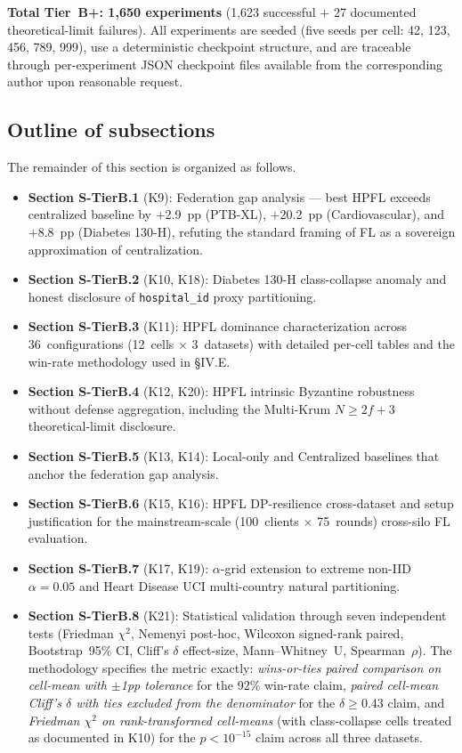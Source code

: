 \documentclass[conference]{IEEEtran}
\begin{document}
\noindent \textbf{Total Tier~B+: 1{,}650 experiments} (1{,}623 successful $+$ 27 documented theoretical-limit failures). All experiments are seeded (five seeds per cell: 42, 123, 456, 789, 999), use a deterministic checkpoint structure, and are traceable through per-experiment JSON checkpoint files available from the corresponding author upon reasonable request.

\subsection*{Outline of subsections}
\label{sec:tier_b_outline}

The remainder of this section is organized as follows.

\begin{itemize}
\item \textbf{Section S-TierB.1} (K9): Federation gap analysis --- best HPFL exceeds centralized baseline by $+$2.9~pp (PTB-XL), $+$20.2~pp (Cardiovascular), and $+$8.8~pp (Diabetes 130-H), refuting the standard framing of FL as a sovereign approximation of centralization.
\item \textbf{Section S-TierB.2} (K10, K18): Diabetes 130-H class-collapse anomaly and honest disclosure of \texttt{hospital\_id} proxy partitioning.
\item \textbf{Section S-TierB.3} (K11): HPFL dominance characterization across 36~configurations (12~cells $\times$ 3~datasets) with detailed per-cell tables and the win-rate methodology used in §IV.E.
\item \textbf{Section S-TierB.4} (K12, K20): HPFL intrinsic Byzantine robustness without defense aggregation, including the Multi-Krum $N{\geq}2f{+}3$ theoretical-limit disclosure.
\item \textbf{Section S-TierB.5} (K13, K14): Local-only and Centralized baselines that anchor the federation gap analysis.
\item \textbf{Section S-TierB.6} (K15, K16): HPFL DP-resilience cross-dataset and setup justification for the mainstream-scale (100~clients $\times$ 75~rounds) cross-silo FL evaluation.
\item \textbf{Section S-TierB.7} (K17, K19): $\alpha$-grid extension to extreme non-IID $\alpha{=}0.05$ and Heart Disease UCI multi-country natural partitioning.
\item \textbf{Section S-TierB.8} (K21): Statistical validation through seven independent tests (Friedman $\chi^2$, Nemenyi post-hoc, Wilcoxon signed-rank paired, Bootstrap~95\% CI, Cliff's $\delta$ effect-size, Mann--Whitney~U, Spearman~$\rho$). The methodology specifies the metric exactly: \emph{wins-or-ties paired comparison on cell-mean with $\pm$1pp tolerance} for the 92\% win-rate claim, \emph{paired cell-mean Cliff's $\delta$ with ties excluded from the denominator} for the $\delta{\geq}0.43$ claim, and \emph{Friedman $\chi^2$ on rank-transformed cell-means} (with class-collapse cells treated as documented in K10) for the $p{<}10^{-15}$ claim across all three datasets.

\end{itemize}
\end{document}
